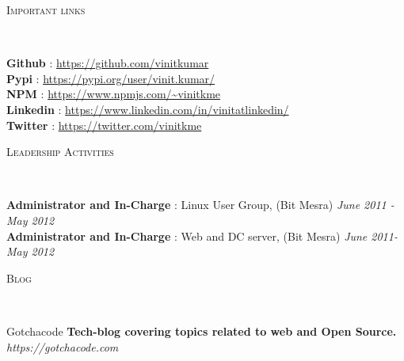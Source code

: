\documentclass[9pt]{article}
\newenvironment{changemargin}[2]{%
  \begin{list}{}{%
    \setlength{\topsep}{0pt}%
    \setlength{\leftmargin}{#1}%
    \setlength{\rightmargin}{#2}%
    \setlength{\listparindent}{\parindent}%
    \setlength{\itemindent}{\parindent}%
    \setlength{\parsep}{\parskip}%
  }%
  \item[]}{\end{list}
}
\newcommand{\lineover}{
    \begin{changemargin}{-0.05in}{-0.05in}
        \vspace*{-8pt}
        \hrulefill \\
        \vspace*{-2pt}
    \end{changemargin}
}
\newcommand{\header}[1]{
    \begin{changemargin}{-0.5in}{-0.5in}
        \scshape{#1}\\
    \lineover
    \end{changemargin}
}
\newenvironment{body} {
    \vspace*{-16pt}
    \begin{changemargin}{-0.25in}{-0.5in}
  }
    {\end{changemargin}
}
\begin{document}
\smallskip


\header{Important links}

\begin{body}
    \vspace{14pt}
    \textbf{Github} :  \url{https://github.com/vinitkumar}\\
    \smallskip
    \textbf{Pypi} :  \url{https://pypi.org/user/vinit.kumar/}\\
    \smallskip
    \textbf{NPM} : \url{https://www.npmjs.com/~vinitkme}\\
    \smallskip
    \textbf{Linkedin} :  \url{https://www.linkedin.com/in/vinitatlinkedin/}\\
    \smallskip
    \textbf{Twitter} :  \url{https://twitter.com/vinitkme}\\
\end{body}

\smallskip

\header{Leadership Activities}

\begin{body}
    \vspace{14pt}
    \textbf{Administrator and In-Charge} : Linux User Group, (Bit Mesra) \hfill {} \emph{June 2011 - May 2012}\\
    \smallskip
    \textbf{Administrator and In-Charge} : Web and DC server, (Bit Mesra) \hfill{} \emph{June 2011- May 2012}\\
\end{body}

\smallskip

\header{Blog}

\begin{body}
    \vspace{14pt}
    Gotchacode \textbf{Tech-blog covering topics related to web and Open Source.} \emph{ https://gotchacode.com}\\
    \smallskip
\end{body}

\smallskip
\end{document}

